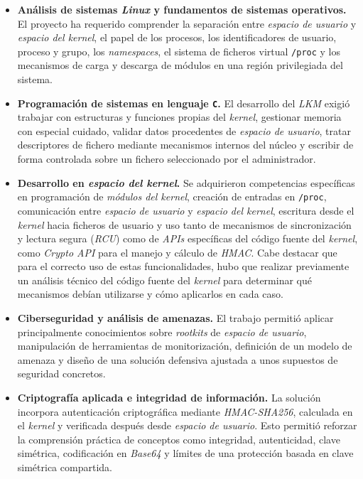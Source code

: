 \begin{itemize}
    \item \textbf{Análisis de sistemas \textit{Linux} y fundamentos de sistemas operativos.} El proyecto ha requerido comprender la separación entre \textit{espacio de usuario} y \textit{espacio del kernel}, el papel de los procesos, los identificadores de usuario, proceso y grupo, los \textit{namespaces}, el sistema de ficheros virtual \texttt{/proc} y los mecanismos de carga y descarga de módulos en una región privilegiada del sistema.
    
    \item \textbf{Programación de sistemas en lenguaje \texttt{C}.} El desarrollo del \textit{LKM} exigió trabajar con estructuras y funciones propias del \textit{kernel}, gestionar memoria con especial cuidado, validar datos procedentes de \textit{espacio de usuario}, tratar descriptores de fichero mediante mecanismos internos del núcleo y escribir de forma controlada sobre un fichero seleccionado por el administrador.
    
    \item \textbf{Desarrollo en \textit{espacio del kernel}.} Se adquirieron competencias específicas en programación de \textit{módulos del kernel}, creación de entradas en \texttt{/proc}, comunicación entre \textit{espacio de usuario} y \textit{espacio del kernel}, escritura desde el \textit{kernel} hacia ficheros de usuario y uso tanto de mecanismos de sincronización y lectura segura (\textit{RCU}) como de \textit{APIs} específicas del código fuente del \textit{kernel}, como \textit{Crypto API} para el manejo y cálculo de \textit{HMAC}.
    Cabe destacar que para el correcto uso de estas funcionalidades, hubo que realizar previamente un análisis técnico del código fuente del \textit{kernel} para determinar qué mecanismos debían utilizarse y cómo aplicarlos en cada caso.
    
    \item \textbf{Ciberseguridad y análisis de amenazas.} El trabajo permitió aplicar principalmente conocimientos sobre \textit{rootkits} de \textit{espacio de usuario}, manipulación de herramientas de monitorización, definición de un modelo de amenaza y diseño de una solución defensiva ajustada a unos supuestos de seguridad concretos.
    
    \item \textbf{Criptografía aplicada e integridad de información.} La solución incorpora autenticación criptográfica mediante \textit{HMAC-SHA256}, calculada en el \textit{kernel} y verificada después desde \textit{espacio de usuario}. Esto permitió reforzar la comprensión práctica de conceptos como integridad, autenticidad, clave simétrica, codificación en \textit{Base64} y límites de una protección basada en clave simétrica compartida.
    

\end{itemize}
